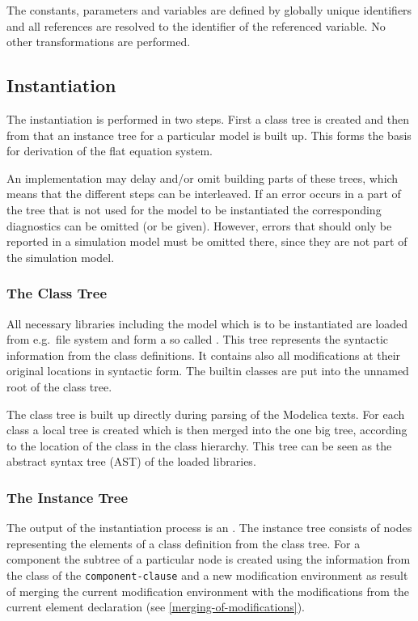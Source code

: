 The constants, parameters and variables are defined by globally unique identifiers and all references are resolved to the identifier of the referenced variable.
No other transformations are performed.


\subsection{Instantiation}\label{instantiation}

The instantiation is performed in two steps.
First a class tree is created and then from that an instance tree for a particular model is built up.
This forms the basis for derivation of the flat equation system.

An implementation may delay and/or omit building parts of these trees, which means that the different steps can be interleaved.
If an error occurs in a part of the tree that is not used for the model to be instantiated the corresponding diagnostics can be omitted (or be given).
However, errors that should only be reported in a simulation model must be omitted there, since they are not part of the simulation model.


\subsubsection{The Class Tree}\label{the-class-tree}

All necessary libraries including the model which is to be instantiated are loaded from e.g.\ file system and form a so called .
This tree represents the syntactic information from the class definitions.
It contains also all modifications at their original locations in syntactic form.
The builtin classes are put into the unnamed root of the class tree.

\begin{nonnormative}
The class tree is built up directly during parsing of the Modelica texts.
For each class a local tree is created which is then merged into the one big tree, according to the location of the class in the class hierarchy.
This tree can be seen as the abstract syntax tree (AST) of the loaded libraries.
\end{nonnormative}


\subsubsection{The Instance Tree}\label{the-instance-tree}

The output of the instantiation process is an .
The instance tree consists of nodes representing the elements of a class definition from the class tree.
For a component the subtree of a particular node is created using the information from the class of the \lstinline[language=grammar]!component-clause! and a new modification environment as result of merging the current modification environment with the modifications from the current element declaration (see \cref{merging-of-modifications}).

